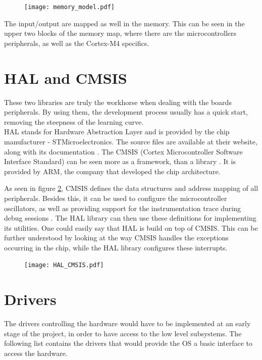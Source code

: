 \begin{figure}[H]
\centering
\texttt{[image: memory\_model.pdf]}
\label{fig:memory_model}
\end{figure}


The input/output are mapped as well in the memory. This can be seen in
the upper two blocks of the memory map, where there are the 
microcontroller\textquotesingle s peripherals, as well as the Cortex-M4
specifics.

\section{HAL and CMSIS}
These two libraries are truly the workhorse when dealing with the 
board\textquotesingle s peripherals. By using them, the development
process usually has a quick start, removing the steepness of the 
learning curve.	\\
HAL stands for Hardware Abstraction Layer and is provided by the chip manufacturer - STMicroelectronics. The source files are available at
their website, along with its documentation \cite{HAL_library}.
The CMSIS (Cortex Microcontroller Software Interface Standard)
can be seen more as a framework, than a library
 \cite{CMSIS_core_library}. It is provided
by ARM, the company that developed the chip architecture.

As seen in figure \ref{fig:CMSIS_HAL}, CMSIS
defines the data structures and address mapping of all peripherals.
Besides this, it can be used to configure the microcontroller
oscillators, as well as providing support for the instrumentation trace during debug sessions \cite{cmsis_reference}.
The HAL library can then use these definitions for implementing its
utilities. One could easily say that HAL is build on top of CMSIS.
This can be further understood by looking at the way CMSIS handles
the exceptions occurring in the chip, while the HAL library configures
these interrupts.

 
\begin{figure}[H]
\centering
\texttt{[image: HAL\_CMSIS.pdf]}
\label{fig:CMSIS_HAL}
\end{figure}

\section{Drivers}

The drivers controlling the hardware would have to be implemented at an 
early stage of the project, in order to have access to the low level
subsystems.
The following list contains the drivers that would provide the OS a basic
interface to access the hardware.

